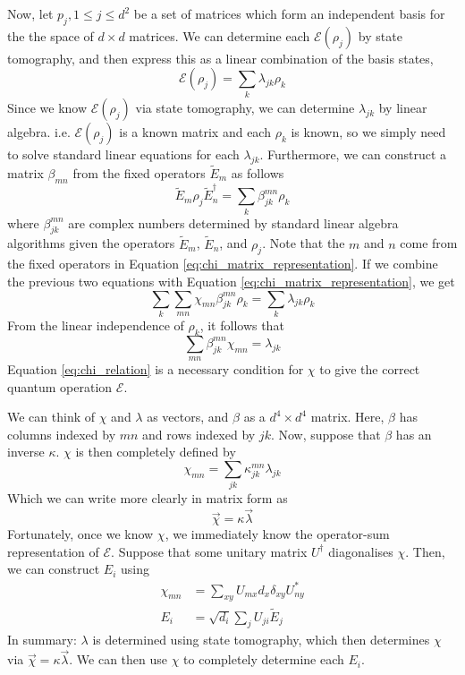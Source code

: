 Now, let $p_j, 1 \le j \le d^2$ be a set of matrices which form an independent basis for the the
space of $d \times d$ matrices. We can determine each $\mathcal{E}(\rho_j)$ by state tomography, and
then express this as a linear combination of the basis states,
\begin{equation}
    \mathcal{E}(\rho_j) = \sum_k \lambda_{jk} \rho_k
\end{equation}
Since we know $\mathcal{E}(\rho_j)$ via state tomography, we can determine $\lambda_{jk}$ by linear
algebra. i.e. $\mathcal{E}(\rho_j)$ is a known matrix and each $\rho_k$ is known, so we simply need
to solve standard linear equations for each $\lambda_{jk}$. Furthermore, we can construct a matrix
$\beta_{mn}$ from the fixed operators $\tilde{E}_m$ as follows
\begin{equation}
    \tilde{E}_m \rho_j \tilde{E}_n^{\dagger} = \sum_k \beta_{jk}^{mn} \rho_k
\end{equation}
where $\beta_{jk}^{mn}$ are complex numbers determined by standard linear algebra algorithms given
the operators $\tilde{E}_m$, $\tilde{E}_n$, and $\rho_j$. Note that the $m$ and $n$ come from the
fixed operators in Equation \ref{eq:chi_matrix_representation}. If we combine the previous two
equations with Equation \ref{eq:chi_matrix_representation}, we get
\begin{equation}
    \sum_k \sum_{mn} \chi_{mn} \beta_{jk}^{mn} \rho_k = \sum_k \lambda_{jk} \rho_k
\end{equation}
From the linear independence of $\rho_k$, it follows that
\begin{equation} \label{eq:chi_relation}
    \sum_{mn} \beta_{jk}^{mn} \chi_{mn} = \lambda_{jk}
\end{equation}
Equation \ref{eq:chi_relation} is a necessary condition for $\chi$ to give the correct quantum
operation $\mathcal{E}$.

We can think of $\chi$ and $\lambda$ as vectors, and $\beta$ as a $d^4 \times d^4$ matrix. Here,
$\beta$ has columns indexed by $mn$ and rows indexed by $jk$. Now, suppose that $\beta$ has an
inverse $\kappa$. $\chi$ is then completely defined by
\begin{equation}
    \chi_{mn} = \sum_{jk} \kappa_{jk}^{mn} \lambda_{jk}
\end{equation}
Which we can write more clearly in matrix form as
\begin{equation}
    \vec{\chi} = \kappa \vec{\lambda}
\end{equation}
Fortunately, once we know $\chi$, we immediately know the operator-sum representation of
$\mathcal{E}$. Suppose that some unitary matrix $U^{\dagger}$ diagonalises $\chi$. Then, we can
construct $E_i$ using
\begin{align}
    \chi_{mn} &= \sum_{xy} U_{mx} d_x \delta_{xy} U^*_{ny} \\
    E_i &= \sqrt{d_i} \sum_j U_{ji} \tilde{E}_j
\end{align}
In summary: $\lambda$ is determined using state tomography, which then determines $\chi$ via
$\vec{\chi} = \kappa \vec{\lambda}$. We can then use $\chi$ to completely determine each $E_i$.

